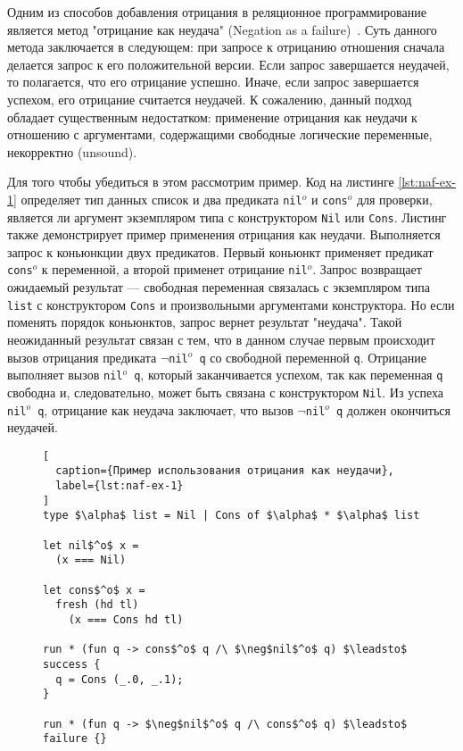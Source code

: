 Одним из способов добавления отрицания в реляционное программирование 
является метод "отрицание как неудача" (Negation as a failure)~\cite{clark1978negation}.
Суть данного метода заключается в следующем:
при запросе к отрицанию отношения сначала делается запрос к 
его положительной версии. 
Если запрос завершается неудачей, то полагается, что его отрицание успешно.
Иначе, если запрос завершается успехом, его отрицание считается неудачей.
К сожалению, данный подход обладает существенным недостатком:
применение отрицания как неудачи к отношению с аргументами,
содержащими свободные логические переменные, некорректно (unsound).

Для того чтобы убедиться в этом рассмотрим пример.
Код на листинге \ref{lst:naf-ex-1} определяет тип данных список 
и два предиката \texttt{nil$^o$} и \texttt{cons$^o$} для проверки,
является ли аргумент экземпляром типа с конструктором \texttt{Nil} или \texttt{Cons}.
Листинг также демонстрирует пример применения отрицания как неудачи.
Выполняется запрос к коньюнкции двух предикатов.
Первый коньюнкт применяет предикат \texttt{cons$^o$} к переменной, 
а второй применет отрицание \texttt{nil$^o$}.
Запрос возвращает ожидаемый результат --- свободная переменная связалась 
с экземпляром типа \texttt{list} с конструктором \texttt{Cons} и произвольными аргументами конструктора.
Но если поменять порядок коньюнктов, запрос вернет результат "неудача".
Такой неожиданный результат связан с тем, 
что в данном случае первым происходит вызов 
отрицания предиката \texttt{$\neg$nil$^o$ q} 
со свободной переменной \texttt{q}.
Отрицание выполняет вызов \texttt{nil$^o$ q}, 
который заканчивается успехом,
так как переменная \texttt{q} свободна и, следовательно,
может быть связана с конструктором \texttt{Nil}.
Из успеха \texttt{nil$^o$ q}, отрицание как неудача заключает, 
что вызов \texttt{$\neg$nil$^o$ q} должен окончиться неудачей. 

\begin{figure}[hbt]
\begin{minipage}{\linewidth}
\begin{lstlisting}[
  caption={Пример использования отрицания как неудачи},
  label={lst:naf-ex-1}
]
type $\alpha$ list = Nil | Cons of $\alpha$ * $\alpha$ list

let nil$^o$ x = 
  (x === Nil)

let cons$^o$ x = 
  fresh (hd tl)
    (x === Cons hd tl)

run * (fun q -> cons$^o$ q /\ $\neg$nil$^o$ q) $\leadsto$ success {
  q = Cons (_.0, _.1);
}

run * (fun q -> $\neg$nil$^o$ q /\ cons$^o$ q) $\leadsto$ failure {}
\end{lstlisting}
\end{minipage}
\end{figure}

